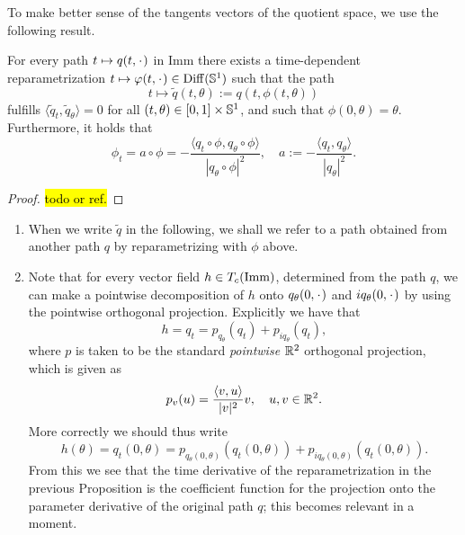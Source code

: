 To make better sense of the tangents vectors of the quotient space, we
use the following result.

\begin{proposition}
  \label{prop:horizontal-path}
  For every path $t \mapsto q(t, \blank)$ in $\mathrm{Imm}$ there exists a
  time-dependent reparametrization $t \mapsto \phi(t, \blank) \in
  \mathrm{Diff}(\S^{1})$ such that the path
  \begin{equation*}
    t \mapsto \tilde{q}(t, \theta):=q(t, \phi(t,\theta))
  \end{equation*}
  fulfills
  $\langle \tilde{q}_t, \tilde{q}_{\theta}\rangle=0$ for all $(t,\theta) \in [0,1]\times \S^1$, and such that $\phi(0, \theta)=\theta$. Furthermore, it holds that
  \begin{equation}
    \label{eq:canon-repar}
    \phi_t = a \circ \phi
    = -\frac{\langle q_t \circ \phi, q_{\theta} \circ \phi\rangle}{|q_{\theta}\circ \phi|^2},
    \quad a := -\frac{\langle q_t,
      q_{\theta}\rangle}{|q_{\theta}|^2}.
  \end{equation}
\end{proposition}

\begin{proof}
  \hl{todo or ref.}
\end{proof}

\begin{remark}
  \label{remark:ortho-decom}
  \begin{enumerate}
  \item  When we write $\tilde{q}$ in the following, we shall we refer to a path obtained from another path $q$ by reparametrizing with $\phi$ above.
  \item Note that for every vector field $h \in T_c(\I)$, determined from the path $q$, we can make a pointwise decomposition of $h$ onto $q_{\theta}(0, \blank)$ and $iq_{\theta}(0, \blank)$ by using the pointwise orthogonal projection. Explicitly we have that
  \begin{equation*}
    h = q_t = p_{q_{\theta}}(q_{t}) + p_{iq_{\theta}}(q_{t}),
  \end{equation*}
  where $p$ is taken to be the standard \textit{pointwise} $\R^2$ orthogonal projection, which is given as
  \begin{equation*}
    p_v(u) = \frac{\langle v, u \rangle}{|v|^2} v, \quad u, v \in \R^2.
  \end{equation*}
  More correctly we should thus write
  \begin{equation*}
    h(\theta) = q_t(0,\theta) = p_{q_{\theta}(0,\theta)}(q_{t}(0,\theta)) +
    p_{iq_{\theta}(0,\theta)}(q_{t}(0,\theta)).
  \end{equation*}
  From this we see that the time derivative of the reparametrization in the previous Proposition is the coefficient function for the projection onto the parameter derivative of the original path $q$; this becomes relevant in a moment.
\end{enumerate}
\end{remark}

